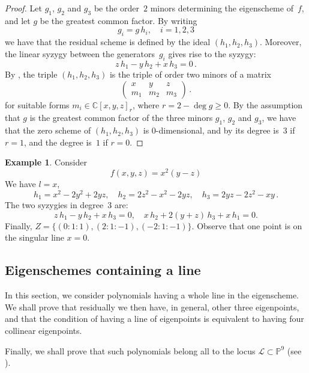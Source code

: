 \documentclass{amsart}
\theoremstyle{plain}
\theoremstyle{definition}
\newtheorem{es}[lemma]{Example}
\newcommand{\C}{\mathbb{C}}
\newcommand{\p}{\mathbb{P}}
\newcommand{\sL}{\mathcal{L}}
\begin{document}
{\begin{proof}
Let $g_1$, $g_2$ and $g_3$ be the order~$2$ minors determining the eigenscheme of~$f$, and let $g$ be the greatest common factor.
By writing
%
\[
  g_i = g \, h_i, \quad i=1,2,3
\]
%
we have that the residual scheme is defined by the ideal
$(h_1,h_2,h_3)$. Moreover, the
linear
syzygy between the generators~$g_i$ gives rise to the syzygy:
%
\[
  z\, h_1 - y\, h_2 + x\, h_3 = 0 \,.
\]
%
By , the triple $(h_1,h_2,h_3)$ is the triple of order two minors of a matrix
%
\[
  \begin{pmatrix}
    x & y & z \\
    m_1 & m_2 & m_3
  \end{pmatrix} \,.
\]
%
for suitable forms $m_i \in \C[x,y,z]_r$, where $r =2 - \deg g \ge 0$.
By the assumption that $g$ is the greatest common factor of the three minors $g_1$, $g_2$ and $g_3$,
we have that the zero scheme of $(h_1,h_2,h_3)$ is $0$-dimensional, and
by  its degree is~$3$ if $r=1$, and the degree is~$1$ if $r=0$.
\end{proof}
}

\begin{es}
Consider
%
\[
  f(x, y, z) = x^2 (y - z)
\]
%
We have $l=x$,
%
\[
 h_1 = x^2-2y^2+2y z, \quad 
 h_2 = 2z^2-x^2-2y z, \quad 
 h_3 = 2yz-2z^2-xy \,.
\]
%
The two syzygies in degree~$3$ are:
%
\[
  z \, h_1 - y \, h_2 + x \, h_3 = 0, \quad x \, h_2 + 2(y+z) \, h_3 + x \, h_1 = 0.
\]
%
Finally, $Z= \{ (0:1:1),(2:1:-1),(-2:1:-1) \}$.
Observe that one point is on the singular line $x=0$.
\end{es}

\subsection{Eigenschemes containing a line}

In this section, we consider polynomials having a whole line in the eigenscheme. We shall prove that residually we then have, in general, other three eigenpoints, and that the condition of having a line of eigenpoints is equivalent to having four collinear eigenpoints.

Finally, we shall prove that such polynomials belong all to the locus $\sL \subset \p^9$ (see ).
\end{document}

